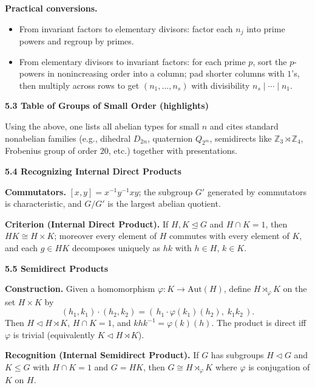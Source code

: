 \documentclass[11pt]{article}
\theoremstyle{definition}
\begin{document}
\medskip
\textbf{Practical conversions.} 
\begin{itemize}\itemsep4pt
  \item From invariant factors to elementary divisors: factor each $n_j$ into prime powers and regroup by primes.
  \item From elementary divisors to invariant factors: for each prime $p$, sort the $p$-powers in nonincreasing order into a column; pad shorter columns with $1$’s, then multiply across rows to get $(n_1,\dots,n_s)$ with divisibility $n_s\mid\cdots\mid n_1$.
\end{itemize}

\newpage

\textbf{5.3 Table of Groups of Small Order (highlights)}

\newpage

Using the above, one lists all abelian types for small $n$ and cites standard nonabelian families (e.g., dihedral $D_{2n}$, quaternion $Q_{2^m}$, semidirects like $\mathbb{Z}_3\rtimes \mathbb{Z}_4$, Frobenius group of order $20$, etc.) together with presentations.

\newpage

\textbf{5.4 Recognizing Internal Direct Products}

\newpage

\textbf{Commutators.} $[x,y]=x^{-1}y^{-1}xy$; the subgroup $G'$ generated by commutators is characteristic, and $G/G'$ is the largest abelian quotient. 

\medskip
\textbf{Criterion (Internal Direct Product).}
If $H,K\trianglelefteq G$ and $H\cap K=1$, then $HK\cong H\times K$; moreover every element of $H$ commutes with every element of $K$, and each $g\in HK$ decomposes uniquely as $hk$ with $h\in H$, $k\in K$.

\newpage

\textbf{5.5 Semidirect Products}

\newpage

\textbf{Construction.} Given a homomorphism $\varphi:K\to \mathrm{Aut}(H)$, define
$H\rtimes_\varphi K$ on the set $H\times K$ by
\[
(h_1,k_1)\cdot(h_2,k_2)=(\,h_1\cdot \varphi(k_1)(h_2),\; k_1k_2\,).
\]
Then $H\lhd H\rtimes K$, $H\cap K=1$, and $k h k^{-1}=\varphi(k)(h)$. The product is direct iff $\varphi$ is trivial (equivalently $K\lhd H\rtimes K$).

\medskip
\textbf{Recognition (Internal Semidirect Product).}
If $G$ has subgroups $H\lhd G$ and $K\le G$ with $H\cap K=1$ and $G=HK$, then $G\cong H\rtimes_\varphi K$ where $\varphi$ is conjugation of $K$ on $H$.
\end{document}
